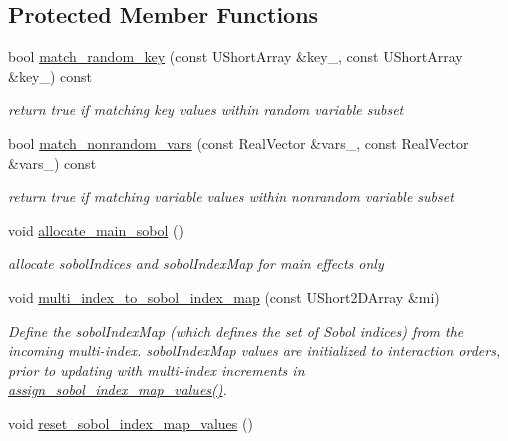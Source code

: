 \subsection*{Protected Member Functions}
\begin{DoxyCompactItemize}
\item 
bool \hyperlink{classPecos_1_1SharedPolyApproxData_a1778d6d4b1fd502966f51003440c857a}{match\+\_\+random\+\_\+key} (const U\+Short\+Array \&key\+\_, const U\+Short\+Array \&key\+\_) const \label{classPecos_1_1SharedPolyApproxData_a1778d6d4b1fd502966f51003440c857a}

\begin{DoxyCompactList}\small\item\em return true if matching key values within random variable subset \end{DoxyCompactList}\item 
bool \hyperlink{classPecos_1_1SharedPolyApproxData_a895c8c58f27eb1344078b09404900592}{match\+\_\+nonrandom\+\_\+vars} (const Real\+Vector \&vars\+\_, const Real\+Vector \&vars\+\_) const \label{classPecos_1_1SharedPolyApproxData_a895c8c58f27eb1344078b09404900592}

\begin{DoxyCompactList}\small\item\em return true if matching variable values within nonrandom variable subset \end{DoxyCompactList}\item 
void \hyperlink{classPecos_1_1SharedPolyApproxData_a9f209bdaf402d977f87f873f12c47aaa}{allocate\+\_\+main\+\_\+sobol} ()\label{classPecos_1_1SharedPolyApproxData_a9f209bdaf402d977f87f873f12c47aaa}

\begin{DoxyCompactList}\small\item\em allocate sobol\+Indices and sobol\+Index\+Map for main effects only \end{DoxyCompactList}\item 
void \hyperlink{classPecos_1_1SharedPolyApproxData_a10db8b54528f27e6bd187bdcd253978b}{multi\+\_\+index\+\_\+to\+\_\+sobol\+\_\+index\+\_\+map} (const U\+Short2\+D\+Array \&mi)\label{classPecos_1_1SharedPolyApproxData_a10db8b54528f27e6bd187bdcd253978b}

\begin{DoxyCompactList}\small\item\em Define the sobol\+Index\+Map (which defines the set of Sobol\textquotesingle{} indices) from the incoming multi-\/index. sobol\+Index\+Map values are initialized to interaction orders, prior to updating with multi-\/index increments in \hyperlink{classPecos_1_1SharedPolyApproxData_abcae46a172605a63f6c1cdaaae8d61cd}{assign\+\_\+sobol\+\_\+index\+\_\+map\+\_\+values()}. \end{DoxyCompactList}\item 
void \hyperlink{classPecos_1_1SharedPolyApproxData_af9cd04177f3f0cb276fbdbef5a0ed06c}{reset\+\_\+sobol\+\_\+index\+\_\+map\+\_\+values} ()\label{classPecos_1_1SharedPolyApproxData_af9cd04177f3f0cb276fbdbef5a0ed06c}


\end{DoxyCompactItemize}
